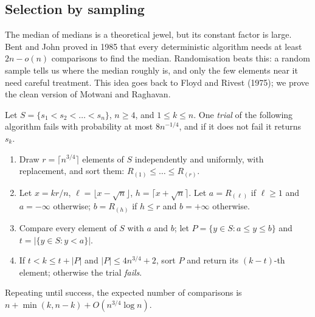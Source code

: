 \subsection*{Selection by sampling}

The median of medians is a theoretical jewel, but its constant factor is large. Bent and John proved in 1985 that every
deterministic algorithm needs at least $2n-o(n)$ comparisons to find the median. Randomisation beats this: a random sample tells us where the median
roughly is, and only the few elements near it need careful treatment. This idea goes back to Floyd and Rivest (1975); we prove the clean version of
Motwani and Raghavan.

\begin{theorem}\label{thm:lazyselect}
Let $S=\{s_1<s_2<\dots<s_n\}$, $n\ge4$, and $1\le k\le n$. One \emph{trial} of the following algorithm fails with probability at most $8n^{-1/4}$, and if it does not fail it
returns $s_k$.
\begin{enumerate}
\item Draw $r=\lceil n^{3/4}\rceil$ elements of $S$ independently and uniformly, with replacement, and sort them: $R_{(1)}\le\dots\le R_{(r)}$.
\item Let $x=kr/n$, $\ell=\lfloor x-\sqrt n\rfloor$, $h=\lceil x+\sqrt n\rceil$. Let $a=R_{(\ell)}$ if $\ell\ge1$ and $a=-\infty$ otherwise; $b=R_{(h)}$ if $h\le r$ and $b=+\infty$ otherwise.
\item Compare every element of $S$ with $a$ and $b$; let $P=\{y\in S:a\le y\le b\}$ and $t=|\{y\in S:y<a\}|$.
\item If $t<k\le t+|P|$ and $|P|\le4n^{3/4}+2$, sort $P$ and return its $(k-t)$-th element; otherwise the trial \emph{fails}.
\end{enumerate}
Repeating until success, the expected number of comparisons is $n+\min(k,n-k)+O(n^{3/4}\log n)$.
\end{theorem}
